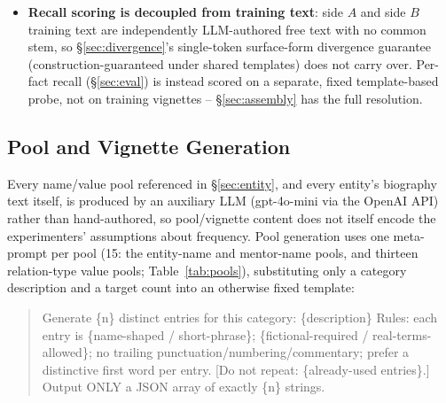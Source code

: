 \documentclass[11pt]{article}
\begin{document}
\begin{itemize}
    (\texttt{preprocess/scheduler.py}). Given the entity's own $(n_A, n_B)$
    (\S\ref{sec:scale}), $v_B = \max(1, \mathrm{round}(8 \cdot n_B /
    (n_A{+}n_B)))$ and $v_A = 8 - v_B$: the side with more scheduled
    occurrences gets proportionally more fresh material before round-robin
    repeats kick in. At the balanced split $(40,40)$ this gives $(4,4)$; at
    every split from $(68,12)$ onward the low side floors to a single
    variant. Combined with $T=80$ (\S\ref{sec:scale}), most occurrences
    necessarily reuse a small number of paragraphs many times over -- an
    explicit, accepted design choice (\S\ref{sec:assembly}).
  \item \textbf{Recall scoring is decoupled from training text}: side $A$
    and side $B$ training text are independently LLM-authored free text with
    no common stem, so \S\ref{sec:divergence}'s single-token surface-form
    divergence guarantee (construction-guaranteed under shared templates)
    does not carry over. Per-fact recall (\S\ref{sec:eval}) is instead scored
    on a separate, fixed template-based probe, not on training vignettes --
    \S\ref{sec:assembly} has the full resolution.
\end{itemize}

\subsection{Pool and Vignette Generation}
\label{sec:generation}

Every name/value pool referenced in \S\ref{sec:entity}, and every entity's
biography text itself, is produced by an auxiliary LLM (gpt-4o-mini via the
OpenAI API) rather than hand-authored, so pool/vignette content does not
itself encode the experimenters' assumptions about frequency. Pool generation
uses one meta-prompt per pool (15: the entity-name and mentor-name pools, and
thirteen relation-type value pools; Table~\ref{tab:pools}), substituting only
a category description and a target count into an otherwise fixed template:

\begin{quote}\small\ttfamily
Generate \{n\} distinct entries for this category: \{description\}\newline
Rules: each entry is \{name-shaped / short-phrase\}; \{fictional-required /
real-terms-allowed\}; no trailing punctuation/numbering/commentary; prefer a
distinctive first word per entry. [Do not repeat: \{already-used entries\}.]\newline
Output ONLY a JSON array of exactly \{n\} strings.
\end{quote}
\end{document}
